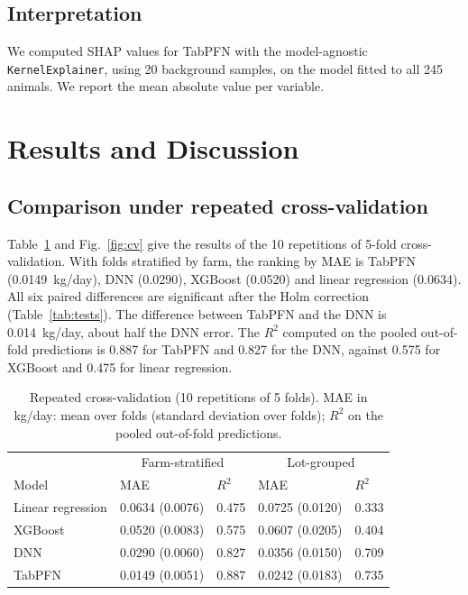 \documentclass[runningheads]{llncs}
\begin{document}
\subsection{Interpretation}

We computed SHAP values \cite{lundberg2017shap} for TabPFN with the model-agnostic \texttt{KernelExplainer}, using 20 background samples, on the model fitted to all 245 animals. We report the mean absolute value per variable.

\section{Results and Discussion}

\subsection{Comparison under repeated cross-validation}

Table~\ref{tab:cv} and Fig.~\ref{fig:cv} give the results of the 10 repetitions of 5-fold cross-validation. With folds stratified by farm, the ranking by MAE is TabPFN (0.0149~kg/day), DNN (0.0290), XGBoost (0.0520) and linear regression (0.0634). All six paired differences are significant after the Holm correction (Table~\ref{tab:tests}). The difference between TabPFN and the DNN is 0.014~kg/day, about half the DNN error. The $R^2$ computed on the pooled out-of-fold predictions is 0.887 for TabPFN and 0.827 for the DNN, against 0.575 for XGBoost and 0.475 for linear regression.

\begin{table}
\caption{Repeated cross-validation (10 repetitions of 5 folds). MAE in kg/day: mean over folds (standard deviation over folds); $R^2$ on the pooled out-of-fold predictions.}\label{tab:cv}
\begin{tabular}{p{2.4cm}p{2.6cm}p{1.6cm}p{2.6cm}p{1.6cm}}
\hline
 & \multicolumn{2}{c}{Farm-stratified} & \multicolumn{2}{c}{Lot-grouped}\\
Model & MAE & $R^2$ & MAE & $R^2$\\
\hline
Linear regression & 0.0634 (0.0076) & 0.475 & 0.0725 (0.0120) & 0.333\\
XGBoost & 0.0520 (0.0083) & 0.575 & 0.0607 (0.0205) & 0.404\\
DNN & 0.0290 (0.0060) & 0.827 & 0.0356 (0.0150) & 0.709\\
TabPFN & 0.0149 (0.0051) & 0.887 & 0.0242 (0.0183) & 0.735\\
\hline
\end{tabular}
\end{table}
\end{document}
